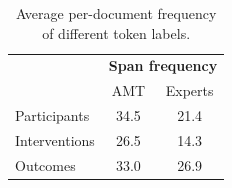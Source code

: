 \documentclass[11pt,a4paper]{article}
\begin{document}

% 



\begin{table}[h]%
    \centering
    \small
    \begin{tabular}{ l c c } 
        & \multicolumn{2}{l}{\textbf{Span frequency}} \\
        \textbf{} & AMT & Experts \\
        \cline{2-3}
        Participants  & 34.5 & 21.4 \\
        Interventions & 26.5 & 14.3 \\ 
        Outcomes      & 33.0 & 26.9 \\ 
    \end{tabular}
    \caption{Average per-document frequency of different token labels.}
   	\label{tab:span_label_freq}
\end{table}
\end{document}
